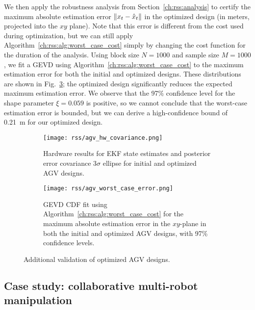 We then apply the robustness analysis from Section~\ref{ch:rss:analysis} to certify the maximum absolute estimation error $\left\lVert x_t - \hat{x}_t\right\rVert$ in the optimized design (in meters, projected into the $xy$ plane). Note that this error is different from the cost used during optimization, but we can still apply Algorithm~\ref{ch:rss:alg:worst_case_cost} simply by changing the cost function for the duration of the analysis. Using block size $N = 1000$ and sample size $M = 1000$, we fit a GEVD using Algorithm~\ref{ch:rss:alg:worst_case_cost} to the maximum estimation error for both the initial and optimized designs. These distributions are shown in Fig.~\ref{ch:rss:fig:agv_gevd}; the optimized design significantly reduces the expected maximum estimation error. We observe that the 97\% confidence level for the shape parameter $\xi = 0.059$ is positive, so we cannot conclude that the worst-case estimation error is bounded, but we can derive a high-confidence bound of \SI{0.21}{m} for our optimized design.

\begin{figure}[tb]
	\centering
	\begin{subfigure}[c]{0.7\linewidth}
		\centering
		\texttt{[image: rss/agv\_hw\_covariance.png]}
		\caption{Hardware results for EKF state estimates and posterior error covariance $3\sigma$ ellipse for initial and optimized AGV designs.}
		\label{ch:rss:fig:agv_hw_cov}
	\end{subfigure}
	\vspace{1em}
	\begin{subfigure}[c]{0.7\linewidth}
		\centering
		\texttt{[image: rss/agv\_worst\_case\_error.png]}
		\caption{GEVD CDF fit using Algorithm~\ref{ch:rss:alg:worst_case_cost} for the maximum absolute estimation error in the $xy$-plane in both the initial and optimized AGV designs, with 97\% confidence levels.}
		\label{ch:rss:fig:agv_gevd}
	\end{subfigure}
	\caption{Additional validation of optimized AGV designs.}
\end{figure}

\subsection{Case study: collaborative multi-robot manipulation}\label{ch:rss:case2}

